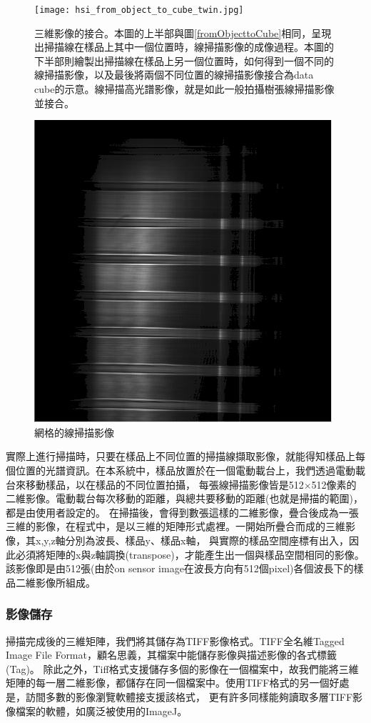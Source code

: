 \documentclass[12pt]{article}
\begin{document}
\begin{figure}
    \centering
    \texttt{[image: hsi\_from\_object\_to\_cube\_twin.jpg]}
    \caption[三維影像的接合]{三維影像的接合。本圖的上半部與圖\ref{fromObjecttoCube}相同，呈現出掃描線在樣品上其中一個位置時，線掃描影像的成像過程。本圖的下半部則繪製出掃描線在樣品上另一個位置時，如何得到一個不同的線掃描影像，以及最後將兩個不同位置的線掃描影像接合為data cube的示意。線掃描高光譜影像，就是如此一般拍攝樹張線掃描影像並接合。}
    \label{fig: form data cube}
\end{figure}


\begin{figure}[h]
    \centering
    \includegraphics[width=0.5\linewidth]{lineSpectrum1213LDLS.png}
    \caption{網格的線掃描影像}
    \label{figure: linespectrum}
\end{figure}

實際上進行掃描時，只要在樣品上不同位置的掃描線擷取影像，就能得知樣品上每個位置的光譜資訊。在本系統中，樣品放置於在一個電動載台上，我們透過電動載台來移動樣品，以在樣品的不同位置拍攝，
每張線掃描影像皆是512$\times$512像素的二維影像。電動載台每次移動的距離，與總共要移動的距離(也就是掃描的範圍)，都是由使用者設定的。
在掃描後，會得到數張這樣的二維影像，疊合後成為一張三維的影像，在程式中，是以三維的矩陣形式處裡。一開始所疊合而成的三維影像，其x,y,z軸分別為波長、樣品y、樣品x軸，
與實際的樣品空間座標有出入，因此必須將矩陣的x與z軸調換(transpose)，才能產生出一個與樣品空間相同的影像。該影像即是由512張(由於on sensor image在波長方向有512個pixel)各個波長下的樣品二維影像所組成。

\subsubsection{影像儲存}\label{section: saveTiff}
掃描完成後的三維矩陣，我們將其儲存為TIFF影像格式。TIFF全名維Tagged Image File Format，顧名思義，其檔案中能儲存影像與描述影像的各式標籤(Tag)。
除此之外，Tiff格式支援儲存多個的影像在一個檔案中，故我們能將三維矩陣的每一層二維影像，都儲存在同一個檔案中。使用TIFF格式的另一個好處是，訪間多數的影像瀏覽軟體接支援該格式，
更有許多同樣能夠讀取多層TIFF影像檔案的軟體，如廣泛被使用的ImageJ。
\end{document}
